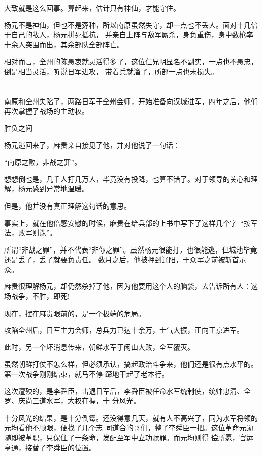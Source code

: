 \documentclass[11pt,a4paper,onecolumn]{article}
\begin{document}
大致就是这么回事。算起来，估计只有神仙，才能守住。

杨元不是神仙，但也不是孬种，所以南原虽然失守，却一点也不丢人。面对十几倍于自己的敌人，杨元拼死抵抗，
并亲自上阵与敌军厮杀，身负重伤，身中数枪率十余人突围而出，其余部队全部阵亡。

相对而言，全州的陈愚衷就灵活得多了，这位仁兄明显名不副实，一点也不愚忠，倒是相当灵活，听说日军进攻，
带着兵就溜了，所部一点也未损失。

\section[\thesection]{}

南原和全州失陷了，两路日军于全州会师，开始准备向汉城进军，四年之后，他们再次掌握了战场的主动权。

胜负之间

杨元逃回来了，麻贵亲自接见了他，并对他说了一句话：

``南原之败，非战之罪''。

想想倒也是，几千人打几万人，毕竟没有投降，也算不错了。对于领导的关心和理解，杨元感到异常地温暖。

但是，他并没有真正理解这句话的意思。

事实上，就在他倍感安慰的时候，麻贵在给兵部的上书中写下了这样几个字--``按军法，败军则诛''。

所谓``非战之罪''，并不代表``非你之罪''。虽然杨元很能打，也很能逃，但城池毕竟还是丢了，丢了就要负责任。
数月之后，他被押到辽阳，于众军之前被斩首示众。

麻贵很理解杨元，却仍然杀掉了他，因为他要用这个人的脑袋，去告诉所有人：这场战争，不胜，即死!

现在，摆在麻贵眼前的，是一个极端的危局。

攻陷全州后，日军主力会师，总兵力已达十余万，士气大振，正向王京进军。

此时，另一个坏消息传来，朝鲜水军于闲山大败，全军覆灭。

虽然朝鲜打仗不怎么样，但必须承认，搞起政治斗争来，他们还是很有点水平的。第一次战争刚刚结束，就马不停
蹄地干起了老本行。

这次遭殃的，是李舜臣，击退日军后，李舜臣被任命水军统制使，统帅忠清、全罗、庆尚三道水军，大权在握，十
分风光。

十分风光的结果，是十分倒霉。还没得意几天，就有人不高兴了，同为水军将领的元均看他不顺眼，便找了几个志
同道合的哥们，整了李舜臣一把。这位革命元勋随即被革职，只保住了一条命，发配至军中立功赎罪。而元均则得
偿所愿，官运亨通，接替了李舜臣的位置。
\end{document}
